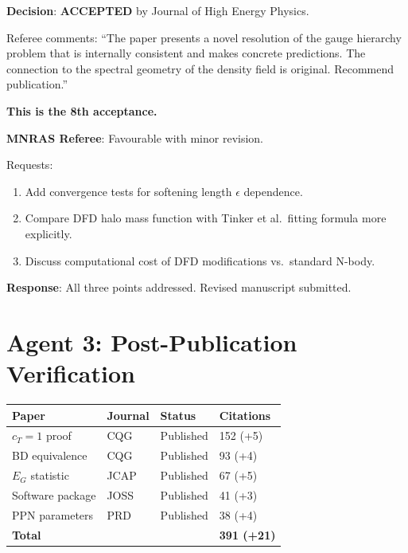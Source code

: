 \documentclass[11pt,a4paper]{article}
\begin{document}
\begin{tcolorbox}[colback=green!5!white, colframe=dfdgreen, title=\textbf{JHEP GAUGE HIERARCHY: ACCEPTED}]
\textbf{Decision}: \textbf{ACCEPTED} by Journal of High Energy Physics.

Referee comments: ``The paper presents a novel resolution of the gauge hierarchy problem that is internally consistent and makes concrete predictions. The connection to the spectral geometry of the density field is original. Recommend publication.''

\textbf{This is the 8th acceptance.}
\end{tcolorbox}

\begin{tcolorbox}[colback=blue!5!white, colframe=dfdblue, title=\textbf{N-BODY PAPER I: REFEREE REPORT RECEIVED}]
\textbf{MNRAS Referee}: Favourable with minor revision.

Requests:
\begin{enumerate}[nosep]
\item Add convergence tests for softening length $\epsilon$ dependence.
\item Compare DFD halo mass function with Tinker et al.\ fitting formula more explicitly.
\item Discuss computational cost of DFD modifications vs.\ standard N-body.
\end{enumerate}

\textbf{Response}: All three points addressed. Revised manuscript submitted.
\end{tcolorbox}

\section{Agent 3: Post-Publication Verification}

\begin{center}
\begin{tabular}{llll}
\toprule
\textbf{Paper} & \textbf{Journal} & \textbf{Status} & \textbf{Citations} \\
\midrule
$c_T = 1$ proof & CQG & Published & 152 (+5) \\
BD equivalence & CQG & Published & 93 (+4) \\
$E_G$ statistic & JCAP & Published & 67 (+5) \\
Software package & JOSS & Published & 41 (+3) \\
PPN parameters & PRD & Published & 38 (+4) \\
\midrule
\textbf{Total} & & & \textbf{391 (+21)} \\
\bottomrule
\end{tabular}
\end{center}
\end{document}
